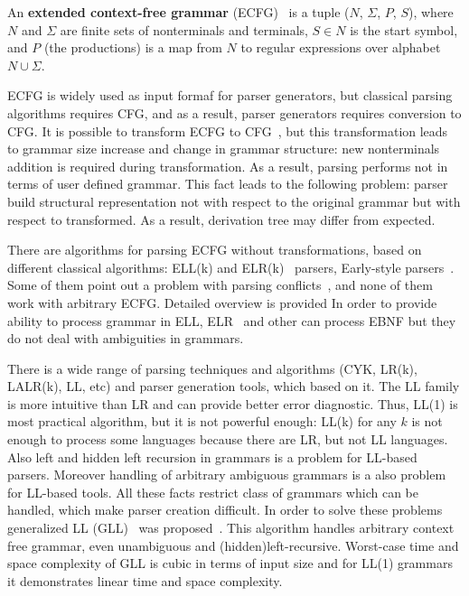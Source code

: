 \documentclass[runningheads,a4paper]{llncs}
\begin{document}
\begin{mydef}
An \textbf{extended context-free grammar} (ECFG)~\cite{ECFG} is a tuple ($N$, $\Sigma$, $P$, $S$), where $N$
and $\Sigma$ are finite sets of nonterminals and terminals, $ S\in N$ is the start symbol,
and $P$ (the productions) is a map from $N$ to regular expressions over alphabet $N \cup \Sigma$.
\end{mydef}

ECFG is widely used as input formaf for parser generators, but classical parsing algorithms requires CFG, and as a result, parser generators requires conversion to CFG.
It is possible to transform ECFG to CFG~\cite{ELL}, but this transformation leads to grammar size 
increase and change in grammar structure: new nonterminals addition is required during transformation.
As a result, parsing performs not in terms of user defined grammar.
This fact leads to the following problem: parser build structural representation not with respect to the 
original grammar but with respect to transformed.
As a result, derivation tree may differ from expected.

There are algorithms for parsing ECFG without transformations, based on different classical algorithms: 
ELL(k) and ELR(k)~\cite{ELL} parsers, Early-style parsers~\cite{!!!}.
Some of them point out a problem with parsing conflicts~\cite{}, and none of them work with arbitrary ECFG.
Detailed overview is provided 
In order to provide ability to process grammar in ELL, ELR~\cite{AttributedELL,ELRR,ECFGparsing,ELLParser,ELL,ECFG,ELALR,ELRParsing} and other can process EBNF but they do not deal with ambiguities in grammars.



There is a wide range of parsing techniques and algorithms (CYK, LR(k), LALR(k), LL, etc) and parser generation tools, which based on it. 
The LL family is more intuitive than LR and can provide better error diagnostic.
Thus, LL(1) is most practical algorithm, but it is not powerful enough: LL(k) for any $k$ is not enough to process some languages because there are LR, but not LL languages.
Also left and hidden left recursion in grammars is a problem for LL-based parsers.
Moreover handling of arbitrary ambiguous grammars is a also problem for LL-based tools.
All these facts restrict class of grammars which can be handled, which make parser creation difficult. 
In order to solve these problems generalized LL (GLL)~\cite{scott2010gll} was proposed~\cite{scott2010gll}. 
This algorithm handles arbitrary context free grammar, even unambiguous and (hidden)left-recursive.
Worst-case time and space complexity of GLL is cubic in terms of input size and for LL(1) grammars it demonstrates linear time and space complexity.
\end{document}
